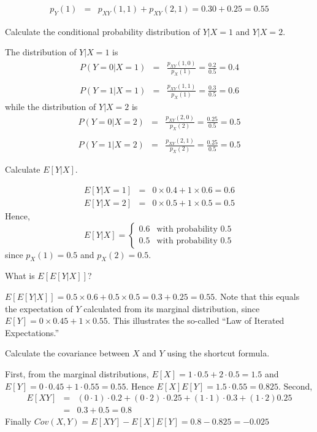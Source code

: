 \documentclass[addpoints,12pt]{exam}
\begin{document}
\begin{questions}
\begin{parts}
\begin{solution}
\begin{eqnarray*}
					p_Y(1) &=& p_{XY}(1,1) + p_{XY}(2,1) = 0.30 + 0.25 = 0.55
				\end{eqnarray*}
			\end{solution}
		\item Calculate the conditional probability distribution of $Y|X=1$ and $Y|X=2$.
			\begin{solution}
			The distribution of $Y|X = 1$ is
				\begin{eqnarray*}
					P(Y = 0|X = 1) &=&\frac{p_{XY}(1,0)}{p_X(1)} = \frac{0.2}{0.5}=0.4\\\\
					P(Y = 1|X= 1) &=&\frac{p_{XY}(1,1)}{p_X(1)} = \frac{0.3}{0.5} = 0.6
				\end{eqnarray*}
				while the distribution of $Y|X = 2$ is
				\begin{eqnarray*}
					P(Y = 0|X = 2) &=&\frac{p_{XY}(2,0)}{p_X(2)} = \frac{0.25}{0.5} = 0.5\\\\
					P(Y = 1|X= 2) &=&\frac{p_{XY}(2,1)}{p_X(2)} = \frac{0.25}{0.5} = 0.5
				\end{eqnarray*}
			\end{solution}
		\item Calculate $E[Y|X]$.
			\begin{solution}
			\begin{eqnarray*}
				E[Y | X =1 ] &=& 0 \times 0.4 + 1 \times 0.6 = 0.6\\
				E[Y | X =2 ] &=& 0 \times 0.5 + 1 \times 0.5 = 0.5
			\end{eqnarray*}
			Hence, 
				$$E[Y|X] = \left\{ \begin{array}{ll} 0.6  & \mbox{with probability } 0.5\\ 0.5& \mbox{with probability } 0.5\end{array} \right.$$
				since $p_X(1) = 0.5$ and $p_X(2) = 0.5$.
			\end{solution}
		\item What is $E[E[Y|X]]$?
			\begin{solution}
			$E[E[Y|X]] = 0.5 \times 0.6 + 0.5 \times 0.5 = 0.3 + 0.25 = 0.55$. Note that this equals the expectation of $Y$ calculated from its marginal distribution, since $E[Y] = 0 \times 0.45 + 1 \times 0.55$. This illustrates the so-called ``Law of Iterated Expectations.''
			\end{solution}
		\item Calculate the covariance between $X$ and $Y$ using the shortcut formula.
		\begin{solution}
		First, from the marginal distributions, $E[X] = 1\cdot 0.5 + 2 \cdot 0.5 = 1.5$ and $E[Y]=0 \cdot 0.45 + 1 \cdot 0.55 = 0.55$. Hence $E[X]E[Y] = 1.5 \cdot 0.55 = 0.825$. Second,
			\begin{eqnarray*}
				E[XY] &=& (0\cdot 1) \cdot 0.2 + (0\cdot 2)\cdot 0.25 + (1\cdot 1) \cdot 0.3 + (1\cdot 2) 0.25\\
						&=& 0.3 + 0.5 = 0.8
			\end{eqnarray*}
			Finally $Cov(X,Y) = E[XY] - E[X]E[Y] = 0.8 - 0.825 = -0.025$
		\end{solution}
	\end{parts}


\end{questions}
\end{document}
